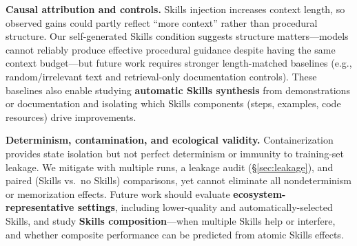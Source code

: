 
\textbf{Causal attribution and controls.}
Skills injection increases context length, so observed gains could partly reflect ``more context'' rather than procedural structure.
Our self-generated Skills condition suggests structure matters---models cannot reliably produce effective procedural guidance despite having the same context budget---but future work requires stronger length-matched baselines (e.g., random/irrelevant text and retrieval-only documentation controls).
These baselines also enable studying \textbf{automatic Skills synthesis} from demonstrations or documentation and isolating which Skills components (steps, examples, code resources) drive improvements.



\textbf{Determinism, contamination, and ecological validity.}
Containerization provides state isolation but not perfect determinism or immunity to training-set leakage.
We mitigate with multiple runs, a leakage audit (\S\ref{sec:leakage}), and paired (Skills vs.\ no Skills) comparisons, yet cannot eliminate all nondeterminism or memorization effects.
Future work should evaluate \textbf{ecosystem-representative settings}, including lower-quality and automatically-selected Skills, and study \textbf{Skills composition}---when multiple Skills help or interfere, and whether composite performance can be predicted from atomic Skills effects.


